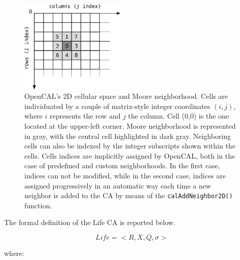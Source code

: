 \begin{figure}
  \begin{center}
    \includegraphics[width=5cm]{./images/OpenCAL/LifeNeighborhood.png}
    \caption{OpenCAL's 2D cellular space and Moore neighborhood. Cells
      are individuated by a couple of matrix-style integer coordinates
      $(i, j)$, where $i$ represents the row and $j$ the column. Cell
      (0,0) is the one located at the upper-left corner. Moore
      neighborhood is represented in gray, with the central cell
      highlighted in dark gray. Neighboring cells can also be indexed by
      the integer subscripts shown within the cells. Cells indices are
      implicitly assigned by OpenCAL, both in the case of predefined
      and custom neighborhoods. In the first case, indices can not be
      modified, while in the second case, indices are assigned
      progressively in an automatic way each time a new neighbor is added
      to the CA by means of the \texttt{calAddNeighbor2D()} function.}
    \label{fig:LifeNeighborhood}
  \end{center}
\end{figure}

The formal definition of the Life CA is reported below.

$$Life = < R, X, Q, \sigma >$$

where:


